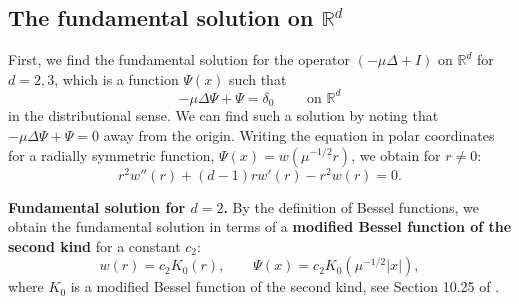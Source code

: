 \documentclass[12pt]{article}
\def\R{{\mathbb R}}
\theoremstyle{plain}
\begin{document}
\subsection{The fundamental solution on $\R^{d}$} 

First, we find the fundamental solution for the operator $(-\mu \Delta + I)$ on $\R^{d}$ for $d = 2, 3$, which is a function $\Psi(x)$ such that 
\begin{equation*}
-\mu \Delta \Psi + \Psi = \delta_{0} \qquad \text{ on } \R^{d}
\end{equation*}
in the distributional sense. We can find such a solution by noting that $-\mu \Delta \Psi + \Psi = 0$ away from the origin. Writing the equation in polar coordinates for a radially symmetric function, $\Psi(x) = w(\mu^{-1/2} r)$, we obtain for $r \ne 0$:
\begin{equation*}
r^{2}w''(r) + (d - 1) r w'(r) - r^{2} w(r) = 0.
\end{equation*}

\medskip

\noindent \textbf{Fundamental solution for $d = 2$.} By the definition of Bessel functions, we obtain the fundamental solution in terms of a \textbf{modified Bessel function of the second kind} for a constant $c_{2}$:
\begin{equation*}
w(r) = c_{2} K_{0}(r), \qquad \Psi(x) = c_{2}K_{0}(\mu^{-1/2} |x|),
\end{equation*}
where $K_{0}$ is a modified Bessel function of the second kind, see Section 10.25 of \cite{DLMF}.
\end{document}
